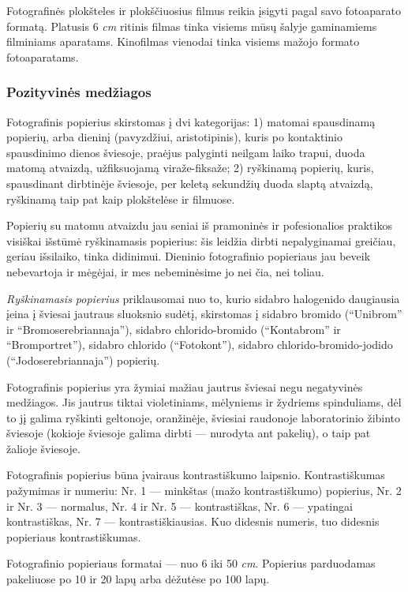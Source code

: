 \documentclass[12pt]{book}
\begin{document}
					Fotografinės plokšteles ir plokščiuosius filmus reikia įsigyti pagal savo fotoaparato formatą. Platusis 6 \textit{cm} ritinis filmas tinka visiems mūsų šalyje gaminamiems filminiams aparatams. Kinofilmas vienodai tinka visiems mažojo formato fotoaparatams.
				\subsubsection*{Pozityvinės medžiagos}
					Fotografinis popierius skirstomas į dvi kategorijas: 1) matomai spausdinamą popierių, arba dieninį (pavyzdžiui, aristotipinis), kuris po kontaktinio spausdinimo dienos šviesoje, praėjus palyginti neilgam laiko trapui, duoda matomą atvaizdą, užfiksuojamą viraže-fiksaže; 2) ryškinamą popierių, kuris, spausdinant dirbtinėje šviesoje, per keletą sekundžių duoda slaptą atvaizdą, ryškinamą taip pat kaip plokštelėse ir filmuose.

					Popierių su matomu atvaizdu jau seniai iš pramoninės ir pofesionalios praktikos visiškai išstūmė ryškinamasis popierius: šis leidžia dirbti nepalyginamai greičiau, geriau išsilaiko, tinka didinimui. Dieninio fotografinio popieriaus jau beveik nebevartoja ir mėgėjai, ir mes nebeminėsime jo nei čia, nei toliau.

					\textit{Ryškinamasis popierius} priklausomai nuo to, kurio sidabro halogenido daugiausia įeina į šviesai jautraus sluoksnio sudėtį, skirstomas į sidabro bromido (``Unibrom'' ir ``Bromoserebriannaja''), sidabro chlorido-bromido (``Kontabrom'' ir ``Bromportret''), sidabro chlorido (``Fotokont''), sidabro chlorido-bromido-jodido (``Jodoserebriannaja'') popierių.

					Fotografinis popierius yra žymiai mažiau jautrus šviesai negu negatyvinės medžiagos. Jis jautrus tiktai violetiniams, mėlyniems ir žydriems spinduliams, dėl to jį galima ryškinti geltonoje, oranžinėje, šviesiai raudonoje laboratorinio žibinto šviesoje (kokioje šviesoje galima dirbti --- nurodyta ant pakelių), o taip pat žalioje šviesoje.

					Fotografinis popierius būna įvairaus kontrastiškumo laipsnio. Kontrastiškumas pažymimas ir numeriu: Nr. 1 --- minkštas (mažo kontrastiškumo) popierius, Nr. 2 ir Nr. 3 --- normalus, Nr. 4 ir Nr. 5 --- kontrastiškas, Nr. 6 --- ypatingai kontrastiškas, Nr. 7 --- kontrastiškiausias. Kuo didesnis numeris, tuo didesnis popieriaus kontrastiškumas.

					Fotografinio popieriaus formatai --- nuo 6 \texttimes 6 iki 50  \textit{cm}. Popierius parduodamas pakeliuose po 10 ir 20 lapų arba dėžutėse po 100 lapų.
\end{document}
